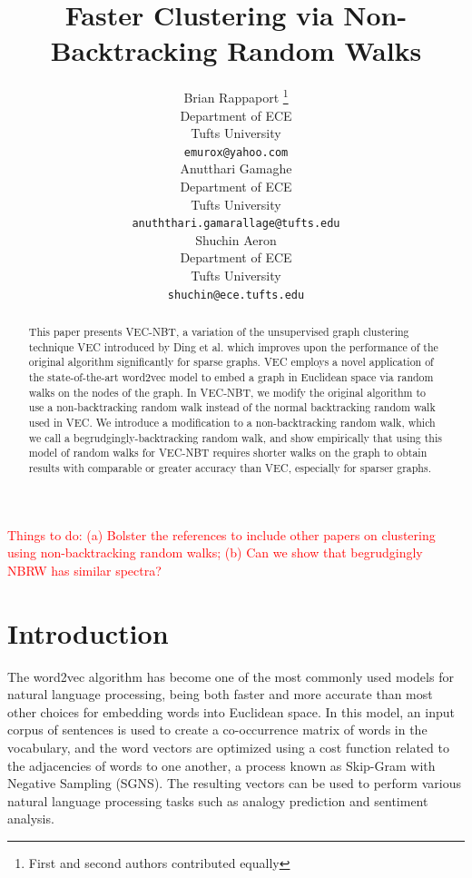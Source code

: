 \documentclass{article} %
\title{Faster Clustering via Non-Backtracking Random Walks}
\author{
Brian Rappaport \thanks{First and second authors contributed equally} \\
Department of ECE\\
Tufts University\\
\texttt{emurox@yahoo.com} \\
\And
Anutthari Gamaghe \\
Department of ECE\\
Tufts University\\
\texttt{anuththari.gamarallage@tufts.edu} \\
\AND
Shuchin Aeron \\
Department of ECE\\
Tufts University\\
\texttt{shuchin@ece.tufts.edu} 
}
\begin{document}
\maketitle

\begin{abstract}
This paper presents VEC-NBT, a variation of the unsupervised graph clustering technique VEC introduced by Ding et al. \cite{NodeEmbed} which improves upon the performance of the original algorithm significantly for sparse graphs. VEC employs a novel application of the state-of-the-art word2vec model \cite{word2vec} to embed a graph in Euclidean space via random walks on the nodes of the graph. In VEC-NBT, we modify the original algorithm to use a non-backtracking random walk instead of the normal backtracking random walk used in VEC. We introduce a modification to a non-backtracking random walk, which we call a begrudgingly-backtracking random walk, and show empirically that using this model of random walks for VEC-NBT requires shorter walks on the graph to obtain results with comparable or greater accuracy than VEC, especially for sparser graphs.
\end{abstract}

\textcolor{red}{Things to do: (a) Bolster the references to include other papers on clustering using non-backtracking random walks; (b) Can we show that begrudgingly NBRW has similar spectra?}

\section{Introduction}

The word2vec algorithm \cite{word2vec} has become one of the most commonly used models for natural language processing, being both faster and more accurate than most other choices for embedding words into Euclidean space. In this model, an input corpus of sentences is used to create a co-occurrence matrix of words in the vocabulary, and the word vectors are optimized using a cost function related to the adjacencies of words to one another, a process known as Skip-Gram with Negative Sampling (SGNS). The resulting vectors can be used to perform various natural language processing tasks such as analogy prediction and sentiment analysis.
\end{document}
